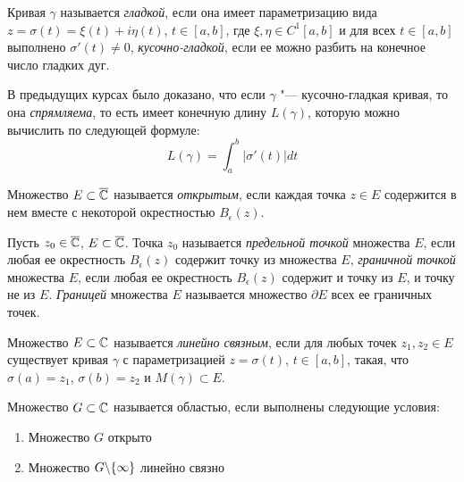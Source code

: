 \begin{definition}
	Кривая $\gamma$ называется \textit{гладкой}, если она имеет параметризацию вида $z = \sigma(t) = \xi(t) + i\eta(t)$, $t \in [a, b]$, где $\xi, \eta \in C^{1}[a, b]$ и для всех $t \in [a, b]$ выполнено $\sigma'(t) \ne 0$, \textit{кусочно-гладкой}, если ее можно разбить на конечное число гладких дуг.
\end{definition}

\begin{note}
	В предыдущих курсах было доказано, что если $\gamma$ "--- кусочно-гладкая кривая, то она \textit{спрямляема}, то есть имеет конечную длину $L(\gamma)$, которую можно вычислить по следующей формуле:
	\[L(\gamma) = \int_a^b|\sigma'(t)|dt\]
\end{note}

\begin{note}
	Множество $E \subset \overline{\mathbb{C}}$ называется \textit{открытым}, если каждая точка $z \in E$ содержится в нем вместе с некоторой окрестностью $B_\epsilon(z)$.
\end{note}

\begin{definition}
	Пусть $z_0 \in \overline{\mathbb{C}}$, $E \subset \overline{\mathbb{C}}$. Точка $z_0$ называется \textit{предельной точкой} множества $E$, если любая ее окрестность $B_\epsilon(z)$ содержит точку из множества $E$, \textit{граничной точкой} множества $E$, если любая ее окрестность $B_\epsilon(z)$ содержит и точку из $E$, и точку не из $E$. \textit{Границей} множества $E$ называется множество $\partial E$ всех ее граничных точек.
\end{definition}

\begin{definition}
	Множество $E \subset \mathbb{C}$ называется \textit{линейно связным}, если для любых точек $z_1, z_2 \in E$ существует кривая $\gamma$ с параметризацией $z = \sigma(t)$, $t \in [a, b]$, такая, что $\sigma(a) = z_1$, $\sigma(b) = z_2$ и $M(\gamma) \subset E$.
\end{definition}

\begin{definition}
	Множество $G \subset \mathbb{C}$ называется областью, если выполнены следующие условия:
	\begin{enumerate}
		\item Множество $G$ открыто
		\item Множество $G \backslash \{\infty\}$ линейно связно
	\end{enumerate}
\end{definition}

